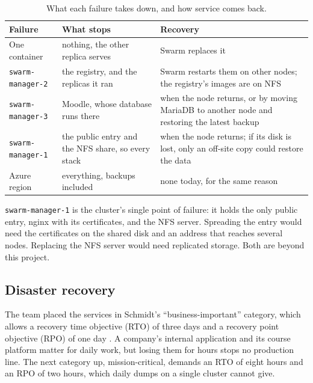 \begin{table}[htbp]
  \centering
  \caption{What each failure takes down, and how service comes back.}
  \label{tab:spof}
  \small
  \begin{tabular}{>{\raggedright\arraybackslash}p{30mm}>{\raggedright\arraybackslash}p{45mm}>{\raggedright\arraybackslash}p{57mm}}
    \toprule
    Failure                  & What stops                              & Recovery \\
    \midrule
    One container            & nothing, the other replica serves       & Swarm replaces it \\
    \texttt{swarm-manager-2} & the registry, and the replicas it ran   & Swarm restarts them on other nodes; the
                                                                         registry's images are on NFS \\
    \texttt{swarm-manager-3} & Moodle, whose database runs there       & when the node returns, or by moving MariaDB
                                                                         to another node and restoring the latest
                                                                         backup \\
    \texttt{swarm-manager-1} & the public entry and the NFS share, so
                               every stack                             & when the node returns; if its disk is lost,
                                                                         only an off-site copy could restore the data \\
    Azure region             & everything, backups included            & none today, for the same reason \\
    \bottomrule
  \end{tabular}
\end{table}

\texttt{swarm-manager-1} is the cluster's single point of failure: it
holds the only public entry, nginx with its certificates, and the NFS
server. Spreading the entry would need the certificates on the shared
disk and an address that reaches several nodes. Replacing the NFS server
would need replicated storage. Both are beyond this project.

\subsection{Disaster recovery}
\label{sec:hadr-dr}

The team placed the services in Schmidt's ``business-important''
category, which allows a recovery time objective (RTO) of three days and
a recovery point objective (RPO) of one day
\parencite{schmidt2006ha,llusa2026hadr}. A company's internal
application and its course platform matter for daily work, but losing
them for hours stops no production line. The next category up,
mission-critical, demands an RTO of eight hours and an RPO of two hours,
which daily dumps on a single cluster cannot give.

